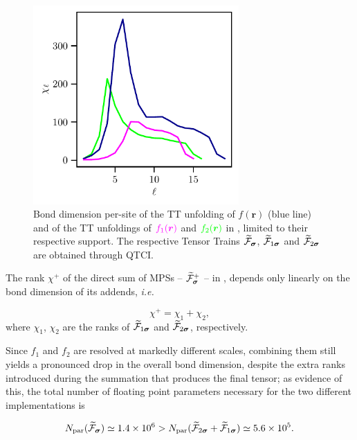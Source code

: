 \begin{figure}[ht!]
	\centering
	\includegraphics[width=0.7\textwidth]{figures/bonddim_localised_func+bonddim_patches.pdf}
	\caption{Bond dimension per-site of the TT unfolding of $f(\boldsymbol{r})$ (blue line) and of the TT unfoldings of ${\color{mymagenta}f_1(\boldsymbol{r})}$ and ${\color{green} f_2(\boldsymbol{r})}$ in , limited to their respective support. The respective Tensor Trains  $\widetilde{\mathcal{F}}_{\boldsymbol{\sigma}}$, $\widetilde{\mathcal{F}}_{1\boldsymbol{\sigma}}$ and $\widetilde{\mathcal{F}}_{2\boldsymbol{\sigma}}$ are obtained through QTCI. }
	\label{fig:bondDimLocalFunc}
\end{figure}

The rank $\chi^+$ of the direct sum of MPSs -- $\widetilde{\mathcal{F}}^+_{\boldsymbol{\sigma}}$ -- in , depends only linearly on the bond dimension of its addends, \textit{i.e.}

\begin{equation}
	\chi^+ = \chi_1 + \chi_2,
\end{equation}
where $\chi_1$, $\chi_2$ are the ranks of $\widetilde{\mathcal{F}}_{1\boldsymbol{\sigma}}$ and $\widetilde{\mathcal{F}}_{2\boldsymbol{\sigma}}$, respectively. 

Since $f_1$ and $f_2$ are resolved at markedly different scales, combining them still yields a pronounced drop in the overall bond dimension, despite the extra ranks introduced during the summation that produces the final tensor; as evidence of this, the total number of floating point parameters necessary for the two different implementations is 

\begin{equation}
	N_{\text{par}}(\widetilde{\mathcal{F}}_{\boldsymbol{\sigma}}) \simeq 1.4 \times 10^6 > N_{\text{par}}(\widetilde{\mathcal{F}}_{2\boldsymbol{\sigma}} + \widetilde{\mathcal{F}}_{1\boldsymbol{\sigma}}) \simeq 5.6 \times 10^5.
	\label{eq:naiveLocalFuncMemorySave}
\end{equation}




